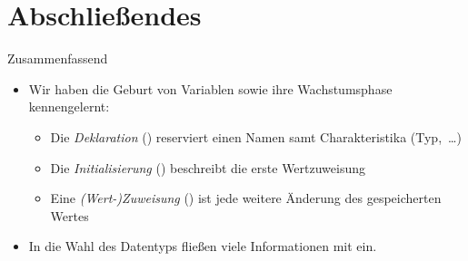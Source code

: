 \section{Abschließendes}
{\SummaryFrame
\begin{frame}[t]{Zusammenfassend}
\pause \printBibCommand
\vfill\vfill %
\begin{itemize}[<+(1)->]
    \itemsep14pt
    \item Wir haben die Geburt von Variablen sowie ihre Wachstumsphase kennengelernt: \begin{itemize}
        \item Die \textit{Deklaration} () reserviert einen Namen samt Charakteristika (Typ,~\ldots)
        \item Die \textit{Initialisierung} () beschreibt die erste Wertzuweisung
        \item Eine \textit{(Wert-)Zuweisung} () ist jede weitere Änderung des gespeicherten Wertes
    \end{itemize}
    \item In die Wahl des  Datentyps fließen viele Informationen mit ein.
\end{itemize}
\end{frame}
}



\iffull\fi
